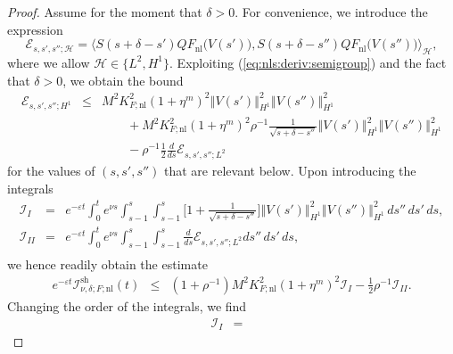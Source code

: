 \documentclass[10pt]{articleHJ}
\newcommand{\e}{\ensuremath{\varepsilon}}
\newcommand{\norm}[1]{\left\Vert#1\right\Vert}		%
\newcommand{\sref}[1]{(\ref{#1})}                       %
\numberwithin{equation}{section}
\begin{document}
\begin{proof}
Assume for the moment that $\delta > 0$.
For convenience,
we introduce the expression
\begin{equation}
\mathcal{E}_{s,s',s''; \mathcal{H}}
= \langle S(s+\delta -s')Q F_{\mathrm{nl}}\big(V(s')\big) ,
  S(s + \delta - s'') Q F_{\mathrm{nl}}\big(V(s'')\big)
\rangle_{\mathcal{H}},
\end{equation}
where we allow $\mathcal{H} \in \{L^2, H^1 \}$.
Exploiting \sref{eq:nls:deriv:semigroup}
and the fact that $\delta > 0$,
we obtain the bound
\begin{equation}
\begin{array}{lcl}
\mathcal{E}_{s,s',s'';H^1}
& \le & M^2 K_{F;\mathrm{nl}}^2 (1 + \eta^m)^2 \norm{V(s')}_{H^1}^2
  \norm{V(s'')}_{H^1}^2
\\[0.2cm]
& & \qquad
 +  M^2 K_{F;\mathrm{nl}}^2 (1 + \eta^m)^2
 \rho^{-1} \frac{1}{\sqrt{s + \delta - s''} }
    \norm{V(s')}_{H^1}^2 \norm{V(s'')}_{H^1}^2
\\[0.2cm]
& & \qquad
  - \rho^{-1} \frac{1}{2}
  \frac{d}{ds}
    \mathcal{E}_{s,s',s'';L^2}
\end{array}
\end{equation}
for the values of $(s,s',s'')$ that are relevant below.
Upon introducing the integrals
\begin{equation}
\begin{array}{lcl}
\mathcal{I}_{I}
 & = &
     e^{-\e t } \int_0^{t}
   e^{\nu s} \int_{s-1}^s \int_{s-1}^s
       \big[ 1 + \frac{1}{\sqrt{s + \delta - s''} } ]
          \norm{V(s')}_{H^1}^2 \norm{V(s'')}_{H^1}^2
             \, ds'' \, ds' \, ds ,
\\[0.2cm]
\mathcal{I}_{II}
& = &
 e^{-\e t } \int_0^{t}
   e^{\nu s} \int_{s-1}^s \int_{s-1}^s
    \frac{d}{ds}   \mathcal{E}_{s,s',s'';L^2} ds'' \, ds' \, ds ,
\\[0.2cm]
\end{array}
\end{equation}
we hence readily obtain the estimate
\begin{equation}
\begin{array}{lcl}
e^{-\e t} \mathcal{I}^{\mathrm{sh}}_{\nu,\delta;F;\mathrm{nl}}(t)
& \le &
  (1 + \rho^{-1}) M^2 K^2_{F;\mathrm{nl}}(1 + \eta^m)^2 \mathcal{I}_{I}
  - \frac{1}{2} \rho^{-1} \mathcal{I}_{II}.
\end{array}
\end{equation}
Changing the order of the integrals, we find
\begin{equation}
\begin{array}{lcl}
 \mathcal{I}_{I} & =&

\end{array}
\end{equation}
\end{proof}
\end{document}
